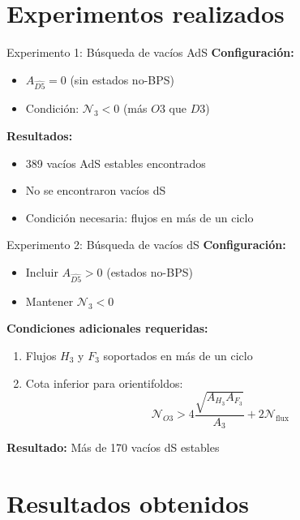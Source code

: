 \documentclass[aspectratio=169]{beamer} %
\begin{document}
\section{Experimentos realizados}

\begin{frame}{Experimento 1: Búsqueda de vacíos AdS}
    \textbf{Configuración:}
    \begin{itemize}
        \item \(A_{\widehat{D5}} = 0\) (sin estados no-BPS)
        \item Condición: \(\mathcal{N}_3 < 0\) (más \(O3\) que \(D3\))
    \end{itemize}
    
    \textbf{Resultados:}
    \begin{itemize}
        \item 389 vacíos AdS estables encontrados
        \item No se encontraron vacíos dS
        \item Condición necesaria: flujos en más de un ciclo
    \end{itemize}
\end{frame}

\begin{frame}{Experimento 2: Búsqueda de vacíos dS}
    \textbf{Configuración:}
    \begin{itemize}
        \item Incluir \(A_{\widehat{D5}} > 0\) (estados no-BPS)
        \item Mantener \(\mathcal{N}_3 < 0\)
    \end{itemize}
    
    \textbf{Condiciones adicionales requeridas:}
    \begin{enumerate}
        \item Flujos \(H_3\) y \(F_3\) soportados en más de un ciclo
        \item Cota inferior para orientifoldos:
        \[
        \mathcal{N}_{O3} > 4\frac{\sqrt{A_{H_3}A_{F_3}}}{A_3} + 2\mathcal{N}_{\text{flux}}
        \]
    \end{enumerate}
    
    \textbf{Resultado:} Más de 170 vacíos dS estables
\end{frame}

\section{Resultados obtenidos}
\end{document}
